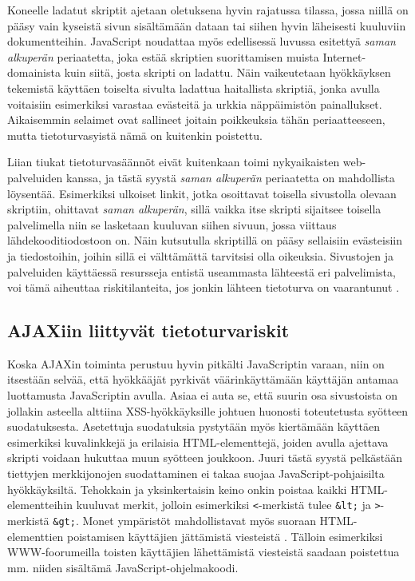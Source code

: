 Koneelle ladatut skriptit ajetaan oletuksena hyvin rajatussa tilassa,
jossa niillä on pääsy vain kyseistä sivun sisältämään dataan tai
siihen hyvin läheisesti kuuluviin dokumentteihin. JavaScript noudattaa
myös \ifdefined\seminaari \relax \else edellisessä luvussa esitettyä
\fi \emph{saman alkuperän} periaatetta, joka estää skriptien
suorittamisen muista Internet-domainista kuin siitä, josta skripti on
ladattu. Näin vaikeutetaan hyökkäyksen tekemistä käyttäen
toiselta sivulta ladattua haitallista skriptiä, jonka avulla
voitaisiin esimerkiksi varastaa evästeitä ja urkkia näppäimistön
painallukset.  Aikaisemmin selaimet ovat sallineet joitain poikkeuksia
tähän periaatteeseen, mutta tietoturvasyistä nämä on kuitenkin
poistettu.

Liian tiukat tietoturvasäännöt eivät kuitenkaan toimi nykyaikaisten
web-palveluiden kanssa, ja tästä syystä \emph{saman alkuperän}
periaatetta on mahdollista löysentää. Esimerkiksi ulkoiset linkit,
jotka osoittavat toisella sivustolla olevaan skriptiin, ohittavat
\emph{saman alkuperän}, sillä vaikka itse skripti sijaitsee toisella
palvelimella niin se lasketaan kuuluvan siihen sivuun, jossa viittaus
lähdekooditiodostoon on.  Näin kutsutulla skriptillä on pääsy
sellaisiin evästeisiin ja tiedostoihin, joihin sillä ei välttämättä
tarvitsisi olla oikeuksia. Sivustojen ja palveluiden käyttäessä
resursseja entistä useammasta lähteestä eri palvelimista, voi tämä
aiheuttaa riskitilanteita, jos jonkin lähteen tietoturva on
vaarantunut \cite{AJAX}.

\subsection{AJAXiin liittyvät tietoturvariskit}

Koska AJAXin toiminta perustuu hyvin pitkälti JavaScriptin varaan,
niin on itsestään selvää, että hyökkääjät pyrkivät väärinkäyttämään
käyttäjän antamaa luottamusta JavaScriptin avulla.  Asiaa ei auta se,
että suurin osa sivustoista on jollakin asteella alttiina
XSS-hyökkäyksille \cite{WEB2c} johtuen huonosti toteutetusta syötteen
suodatuksesta. Asetettuja suodatuksia pystytään myös kiertämään
käyttäen esimerkiksi kuvalinkkejä ja erilaisia HTML-elementtejä,
joiden avulla ajettava skripti voidaan hukuttaa muun syötteen
joukkoon. Juuri tästä syystä pelkästään tiettyjen merkkijonojen
suodattaminen ei takaa suojaa JavaScript-pohjaisilta
hyökkäyksiltä. Tehokkain ja yksinkertaisin keino onkin poistaa kaikki
HTML-elementteihin kuuluvat merkit, jolloin esimerkiksi \texttt{<}-merkistä tulee
\texttt{\&lt;} ja \texttt{>}-merkistä \texttt{\&gt;}. Monet ympäristöt
mahdollistavat myös suoraan HTML-elementtien poistamisen käyttäjien
jättämistä viesteistä \cite{AJAX}. Tälloin esimerkiksi WWW-foorumeilla
toisten käyttäjien lähettämistä viesteistä saadaan poistettua
mm. niiden sisältämä JavaScript-ohjelmakoodi.

